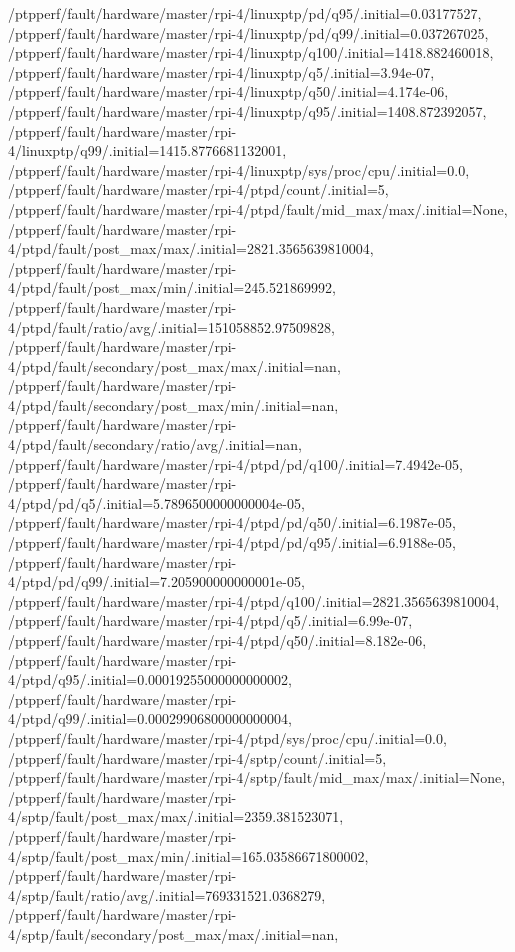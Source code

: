 {    /ptpperf/fault/hardware/master/rpi-4/linuxptp/pd/q95/.initial=0.03177527,
    /ptpperf/fault/hardware/master/rpi-4/linuxptp/pd/q99/.initial=0.037267025,
    /ptpperf/fault/hardware/master/rpi-4/linuxptp/q100/.initial=1418.882460018,
    /ptpperf/fault/hardware/master/rpi-4/linuxptp/q5/.initial=3.94e-07,
    /ptpperf/fault/hardware/master/rpi-4/linuxptp/q50/.initial=4.174e-06,
    /ptpperf/fault/hardware/master/rpi-4/linuxptp/q95/.initial=1408.872392057,
    /ptpperf/fault/hardware/master/rpi-4/linuxptp/q99/.initial=1415.8776681132001,
    /ptpperf/fault/hardware/master/rpi-4/linuxptp/sys/proc/cpu/.initial=0.0,
    /ptpperf/fault/hardware/master/rpi-4/ptpd/count/.initial=5,
    /ptpperf/fault/hardware/master/rpi-4/ptpd/fault/mid_max/max/.initial=None,
    /ptpperf/fault/hardware/master/rpi-4/ptpd/fault/post_max/max/.initial=2821.3565639810004,
    /ptpperf/fault/hardware/master/rpi-4/ptpd/fault/post_max/min/.initial=245.521869992,
    /ptpperf/fault/hardware/master/rpi-4/ptpd/fault/ratio/avg/.initial=151058852.97509828,
    /ptpperf/fault/hardware/master/rpi-4/ptpd/fault/secondary/post_max/max/.initial=nan,
    /ptpperf/fault/hardware/master/rpi-4/ptpd/fault/secondary/post_max/min/.initial=nan,
    /ptpperf/fault/hardware/master/rpi-4/ptpd/fault/secondary/ratio/avg/.initial=nan,
    /ptpperf/fault/hardware/master/rpi-4/ptpd/pd/q100/.initial=7.4942e-05,
    /ptpperf/fault/hardware/master/rpi-4/ptpd/pd/q5/.initial=5.7896500000000004e-05,
    /ptpperf/fault/hardware/master/rpi-4/ptpd/pd/q50/.initial=6.1987e-05,
    /ptpperf/fault/hardware/master/rpi-4/ptpd/pd/q95/.initial=6.9188e-05,
    /ptpperf/fault/hardware/master/rpi-4/ptpd/pd/q99/.initial=7.205900000000001e-05,
    /ptpperf/fault/hardware/master/rpi-4/ptpd/q100/.initial=2821.3565639810004,
    /ptpperf/fault/hardware/master/rpi-4/ptpd/q5/.initial=6.99e-07,
    /ptpperf/fault/hardware/master/rpi-4/ptpd/q50/.initial=8.182e-06,
    /ptpperf/fault/hardware/master/rpi-4/ptpd/q95/.initial=0.00019255000000000002,
    /ptpperf/fault/hardware/master/rpi-4/ptpd/q99/.initial=0.00029906800000000004,
    /ptpperf/fault/hardware/master/rpi-4/ptpd/sys/proc/cpu/.initial=0.0,
    /ptpperf/fault/hardware/master/rpi-4/sptp/count/.initial=5,
    /ptpperf/fault/hardware/master/rpi-4/sptp/fault/mid_max/max/.initial=None,
    /ptpperf/fault/hardware/master/rpi-4/sptp/fault/post_max/max/.initial=2359.381523071,
    /ptpperf/fault/hardware/master/rpi-4/sptp/fault/post_max/min/.initial=165.03586671800002,
    /ptpperf/fault/hardware/master/rpi-4/sptp/fault/ratio/avg/.initial=769331521.0368279,
    /ptpperf/fault/hardware/master/rpi-4/sptp/fault/secondary/post_max/max/.initial=nan,
}
